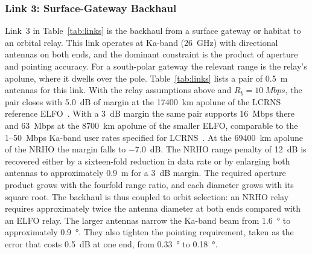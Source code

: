 \documentclass{IEEEoj}
\begin{document}
\subsubsection{Link 3: Surface-Gateway Backhaul}
Link~3 in Table~\ref{tab:links} is the backhaul from a surface gateway or habitat to an orbital relay. This link operates at Ka-band (\SI{26}{GHz}) with directional antennas on both ends, and the dominant constraint is the product of aperture and pointing accuracy. For a south-polar gateway the relevant range is the relay's apolune, where it dwells over the pole. Table~\ref{tab:links} lists a pair of \SI{0.5}{m} antennas for this link. With the relay assumptions above and $R_b = \SI{10}{Mbps}$, the pair closes with \SI{5.0}{dB} of margin at the \SI{17400}{km} apolune of the LCRNS reference ELFO~\cite{lcrns_ref_const}. With a \SI{3}{dB} margin the same pair supports \SI{16}{Mbps} there and \SI{63}{Mbps} at the \SI{8700}{km} apolune of the smaller ELFO, comparable to the \SI{1}{}--\SI{50}{Mbps} Ka-band user rates specified for LCRNS~\cite{nasa_lunar_relay_srd}. At the \SI{69400}{km} apolune of the NRHO the margin falls to \SI{-7.0}{dB}. The NRHO range penalty of \SI{12}{dB} is recovered either by a sixteen-fold reduction in data rate or by enlarging both antennas to approximately \SI{0.9}{m} for a \SI{3}{dB} margin. The required aperture product grows with the fourfold range ratio, and each diameter grows with its square root. The backhaul is thus coupled to orbit selection: an NRHO relay requires approximately twice the antenna diameter at both ends compared with an ELFO relay. The larger antennas narrow the Ka-band beam from \SI{1.6}{\degree} to approximately \SI{0.9}{\degree}. They also tighten the pointing requirement, taken as the error that costs \SI{0.5}{dB} at one end, from \SI{0.33}{\degree} to \SI{0.18}{\degree}.
\end{document}

